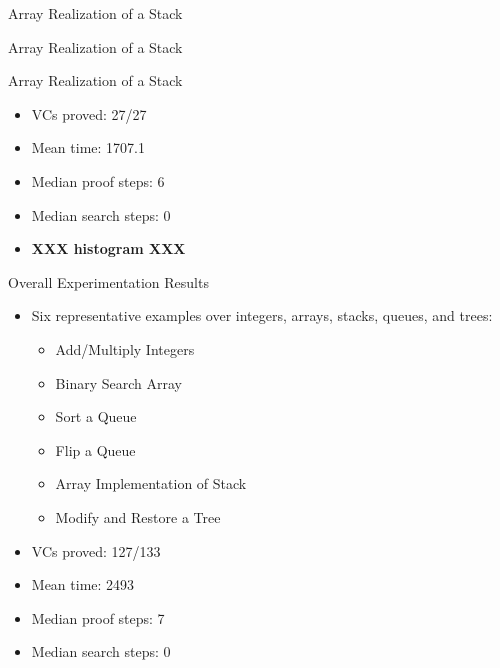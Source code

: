 \begin{frame}{Array Realization of a Stack}
	
\end{frame}


\begin{frame}{Array Realization of a Stack}
	
\end{frame}


\begin{frame}{Array Realization of a Stack}
	\begin{itemize}
		\item VCs proved: 27/27
		\item Mean time: 1707.1
		\item Median proof steps: 6
		\item Median search steps: 0
		\item \textbf{XXX histogram XXX}
	\end{itemize}
\end{frame}


\begin{frame}{Overall Experimentation Results}
	\begin{itemize}
		\item Six representative examples over integers, arrays, stacks, queues, and trees:\\
		\begin{itemize}
			\item Add/Multiply Integers
			\item Binary Search Array
			\item Sort a Queue
			\item Flip a Queue
			\item Array Implementation of Stack
			\item Modify and Restore a Tree
		\end{itemize}
		\item VCs proved: 127/133
		\item Mean time: 2493
		\item Median proof steps: 7
		\item Median search steps: 0
	\end{itemize}
\end{frame}


